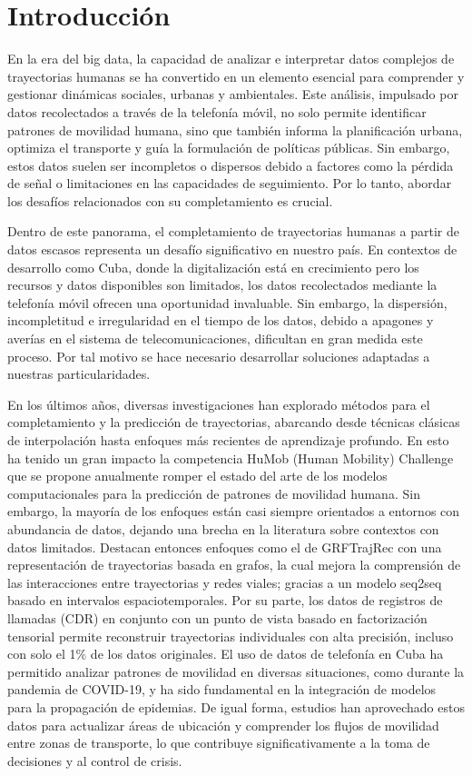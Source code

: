 \chapter*{Introducción}\label{chapter:introduction}

En la era del big data, la capacidad de analizar e interpretar datos complejos de trayectorias humanas se ha convertido en un 
elemento esencial para comprender y gestionar dinámicas sociales, urbanas y ambientales. Este análisis, impulsado por datos 
recolectados a través de la telefonía móvil, no solo permite identificar patrones de movilidad humana, sino que también informa 
la planificación urbana, optimiza el transporte y guía la formulación de políticas públicas. Sin embargo, estos datos suelen ser 
incompletos o dispersos debido a factores como la pérdida de señal o limitaciones en las capacidades de seguimiento. Por lo tanto, 
abordar los desafíos relacionados con su completamiento es crucial.

Dentro de este panorama, el completamiento de trayectorias humanas a partir de datos escasos representa un desafío significativo 
en nuestro país. En contextos de desarrollo como Cuba, donde la digitalización está en crecimiento pero los recursos y datos 
disponibles son limitados, los datos recolectados mediante la telefonía móvil ofrecen una oportunidad invaluable. Sin embargo, 
la dispersión, incompletitud e irregularidad en el tiempo de los datos, debido a apagones y averías en el sistema de 
telecomunicaciones, dificultan en gran medida este proceso. Por tal motivo se hace necesario desarrollar soluciones adaptadas a 
nuestras particularidades.

En los últimos años, diversas investigaciones han explorado métodos para el completamiento y la predicción de trayectorias, 
abarcando desde técnicas clásicas de interpolación hasta enfoques más recientes de aprendizaje profundo. En esto ha tenido un 
gran impacto la competencia HuMob (Human Mobility) Challenge que se propone anualmente romper el estado del arte de los modelos 
computacionales para la predicción de patrones de movilidad humana. Sin embargo, la mayoría de los enfoques están casi siempre 
orientados a entornos con abundancia de datos, dejando una brecha en la literatura sobre contextos con datos limitados. Destacan 
entonces enfoques como el de GRFTrajRec con una representación de trayectorias basada en grafos, la cual mejora la comprensión 
de las interacciones entre trayectorias y redes viales; gracias a un modelo seq2seq basado en intervalos espaciotemporales. Por 
su parte, los datos de registros de llamadas (CDR) en conjunto con un punto de vista basado en factorización tensorial permite 
reconstruir trayectorias individuales con alta precisión, incluso con solo el 1$\%$ de los datos originales. El uso de datos de 
telefonía en Cuba ha permitido analizar patrones de movilidad en diversas situaciones, como durante la pandemia de COVID-19, y 
ha sido fundamental en la integración de modelos para la propagación de epidemias. De igual forma, estudios han aprovechado estos 
datos para actualizar áreas de ubicación y comprender los flujos de movilidad entre zonas de transporte, lo que contribuye 
significativamente a la toma de decisiones y al control de crisis.

